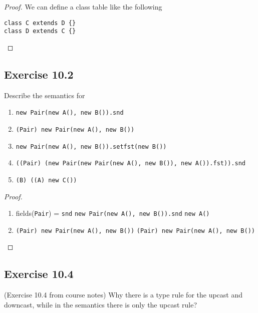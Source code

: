 \documentclass[12pt,a4paper,oneside]{book}
\begin{document}
\begin{proof}
	We can define a class table like the following
\begin{verbatim}
class C extends D {}
class D extends C {}
\end{verbatim}
\end{proof}

\subsection{Exercise 10.2}

\begin{exercise}
	Describe the semantics for
	\begin{enumerate}
		\item \texttt{new Pair(new A(), new B()).snd}
		\item \texttt{(Pair) new Pair(new A(), new B())}
		\item \texttt{new Pair(new A(), new B()).setfst(new B())}
		\item \texttt{((Pair) (new Pair(new Pair(new A(), new B()), new A()).fst)).snd}
		\item \texttt{(B) ((A) new C())}
	\end{enumerate}
\end{exercise}

\begin{proof}
	\begin{enumerate}
		\item 
		\prooftree
		  \prooftree
		    \nohyp
		  \justifies
		    fields(\texttt{Pair}) =  \quad \texttt{snd} \in {}
		  \endprooftree
		\justifies
		  \texttt{new Pair(new A(), new B()).snd} \to \texttt{new A()}
		\endprooftree
		
		\item 
		\prooftree
		  \nohyp
		\justifies
		  \texttt{(Pair) new Pair(new A(), new B())} \to \texttt{(Pair) new Pair(new A(), new B())}
		\endprooftree
		
	\end{enumerate}
\end{proof}

\subsection{Exercise 10.4}

\begin{exercise}{(Exercise 10.4 from course notes)}
	Why there is a type rule for the upcast and downcast, while in the semantics there is only the upcast rule?
\end{exercise}
\end{document}
